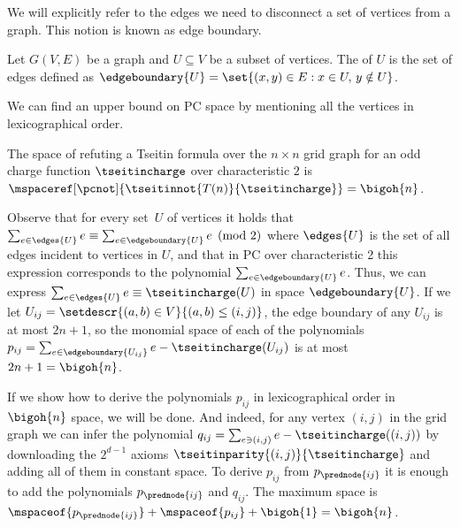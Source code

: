 We will explicitly refer to the edges we need to disconnect a set of vertices from a graph. This notion is known as edge boundary.
\begin{definition}
  \label{def:edge-boundary}
  Let $G(V,E)$ be a graph and $U\subseteq V$ be a subset of vertices. The  of $U$ is the set of edges
  defined as %
  $\edgeboundary{U}=\set{(x,y)\in E : x\in U,\,y\notin U}$.
\end{definition}

We can find an upper bound on PC space by mentioning all the vertices in lexicographical order.

\begin{lemma}
  The space of refuting a Tseitin formula over the $n\times n$ grid graph for an odd charge function $\tseitincharge$ over characteristic $2$ is $\mspaceref[\pcnot]{\tseitinnot{T(n)}{\tseitincharge}}=\bigoh{n}$.
\end{lemma}
\begin{ourproof}[sketch]
  Observe that for every %
  set~$U$ of vertices
  it holds that $\sum_{e \in \edges{U}} e \equiv \sum_{e \in \edgeboundary{U}}e \pmod{2}$ where $\edges{U}$ is the set of all edges incident to vertices in $U$, and that in PC over characteristic 2 this expression corresponds to the polynomial $\sum_{e \in \edgeboundary{U}}e$. Thus, we can express $\sum_{e \in \edges{U}} e \equiv \tseitincharge(U)$ in space $\edgeboundary{U}$. If we let $U_{ij}=\setdescr{(a,b)\in V}{(a,b)\leq (i,j)}$, the edge boundary of any $U_{ij}$ is at most $2n+1$, so the monomial space of each of the polynomials $p_{ij}=\sum_{e \in \edgeboundary{U_{ij}}}e-\tseitincharge(U_{ij})$ is at most $2n+1=\bigoh{n}$.

  If we show how to derive the polynomials $p_{ij}$ in lexicographical order in $\bigoh{n}$ space, we will be done. And indeed, for any vertex $(i,j)$ in the grid graph we can infer the polynomial $q_{ij}=\sum_{e\ni (i,j)}e-\tseitincharge((i, j))$ by downloading the $2^{d-1}$ axioms $\tseitinparity{(i,j)}{\tseitincharge}$ and adding all of them in constant space. To derive $p_{ij}$ from $p_{\prednode{ij}}$ it is enough to add the polynomials $p_{\prednode{ij}}$ and $q_{ij}$. The maximum space is $\mspaceof{p_{\prednode{ij}}}+\mspaceof{p_{ij}}+\bigoh{1}=\bigoh{n}$.
\end{ourproof}

